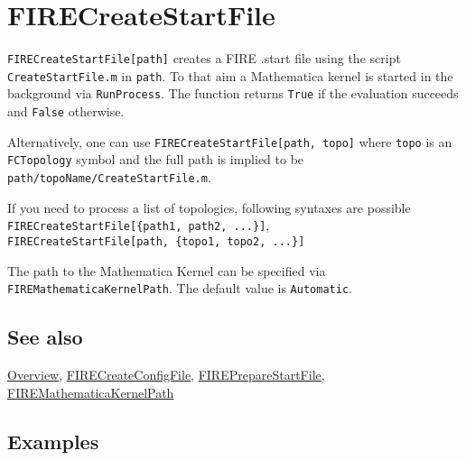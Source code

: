 \documentclass[../FeynHelpersManual.tex]{subfiles}
\begin{document}
\hypertarget{firecreatestartfile}{
\section{FIRECreateStartFile}\label{firecreatestartfile}}

\texttt{FIRECreateStartFile[\allowbreak{}path]} creates a FIRE .start
file using the script \texttt{CreateStartFile.m} in \texttt{path}. To
that aim a Mathematica kernel is started in the background via
\texttt{RunProcess}. The function returns \texttt{True} if the
evaluation succeeds and \texttt{False} otherwise.

Alternatively, one can use
\texttt{FIRECreateStartFile[\allowbreak{}path,\ \allowbreak{}topo]}
where \texttt{topo} is an \texttt{FCTopology} symbol and the full path
is implied to be \texttt{path/topoName/CreateStartFile.m}.

If you need to process a list of topologies, following syntaxes are
possible
\texttt{FIRECreateStartFile[\allowbreak{}\{\allowbreak{}path1,\ \allowbreak{}path2,\ \allowbreak{}...\}]},
\texttt{FIRECreateStartFile[\allowbreak{}path,\ \allowbreak{}\{\allowbreak{}topo1,\ \allowbreak{}topo2,\ \allowbreak{}...\}]}

The path to the Mathematica Kernel can be specified via
\texttt{FIREMathematicaKernelPath}. The default value is
\texttt{Automatic}.

\subsection{See also}

\hyperlink{toc}{Overview},
\hyperlink{firecreateconfigfile}{FIRECreateConfigFile},
\hyperlink{firepreparestartfile}{FIREPrepareStartFile},
\hyperlink{firemathematicakernelpath}{FIREMathematicaKernelPath}

\subsection{Examples}
\end{document}
